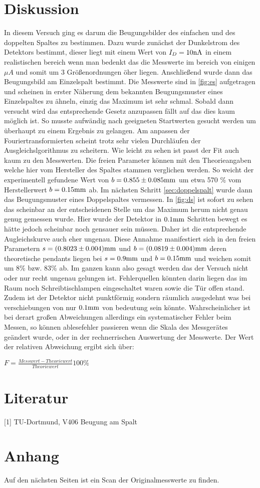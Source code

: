 \section{Diskussion}
\label{sec:diskussion}
In diesem Versuch ging es darum die Beugungsbilder des einfachen und des doppelten Spaltes zu bestimmen.
Dazu wurde zunächst der Dunkelstrom des Detektors bestimmt, dieser liegt mit einem Wert von $I_D=10\si[]{nA}$
in einem realistischen bereich wenn man bedenkt das die Messwerte im bereich von einigen $\mu A$ und somit um
3 Größenordnungen öher liegen. Anschließend wurde dann das Beugungsbild am Einzelspalt bestimmt. Die Messwerte
sind in \autoref{fig:es} aufgetragen und scheinen in erster Näherung dem bekannten Beugungsmuster eines Einzelspaltes
zu ähneln, einzig das Maximum ist sehr schmal. Sobald dann versucht wird das entsprechende Gesetz anzupassen 
fällt auf das dies kaum möglich ist. So musste aufwändig nach geeigneten Startwerten gesucht werden um überhaupt zu
einem Ergebnis zu gelangen. Am anpassen der Fouriertransformierten
scheint trotz sehr vielen Durchläufen der Ausgleichslgorithmus zu scheitern. 
Wie leicht zu sehen ist passt der Fit auch kaum zu den Messwerten. Die freien Parameter
können mit den Theorieangaben welche hier vom Hersteller des Spaltes stammen verglichen werden. So weicht
der experimentell gefundene Wert von $b=0.855\pm 0.085\si[]{mm}$ um etwa 570 \% vom Herstellerwert $b=0.15\si[]{mm}$
ab. Im nächsten Schritt \autoref{sec:doppelspalt} wurde dann das Beugungsmuster eines Doppelspaltes vermessen. 
In \autoref{fig:ds} ist sofort zu sehen das scheinbar an der entscheidenen Stelle um das Maximum herum nicht genau
genug gemessen wurde. Hier wurde der Detektor in $0.1\si[]{mm}$ Schritten bewegt es hätte jedoch scheinbar noch gensauer
sein müssen. Daher ist die entsprechende Augleichskurve auch eher ungenau. Diese Annahme manifestiert sich 
in den freien Parametern $s=(0.8023\pm 0.004)\si[]{mm}$ und $b=(0.0819\pm 0.004)\si[]{mm}$ deren theoretische pendants
liegen bei $s=0.9\si[]{mm}$ und $b=0.15\si[]{mm}$ und weichen somit um 8\% bzw. 83\% ab. Im ganzen kann 
also gesagt werden das der Versuch nicht oder nur recht ungenau gelungen ist. Fehlerquellen könnten darin liegen das
im Raum noch Schreibtischlampen eingeschaltet waren sowie die Tür offen stand. Zudem ist der Detektor nicht 
punktförmig sondern räumlich ausgedehnt was bei verschiebungen von nur $0.1\si[]{mm}$ von bedeutung sein könnte.
Wahrscheinlicher ist bei derart großen Abweichungen allerdings ein systematischer Fehler beim Messen, so können 
ablesefehler passieren wenn die Skala des Messgerätes geändert wurde, oder in der rechnerrischen Auswertung der
Messwerte.
Der Wert der relativen Abweichung ergibt sich über:
\begin{center}
    $F=\frac{Messwert-Theoriewert}{Theoriewert} 100\%$
\end{center}
\section{Literatur}
\label{sec:literatur}
[1] TU-Dortmund, V406 Beugung am Spalt

\section{Anhang}
\label{sec:Anhang}
Auf den nächsten Seiten ist ein Scan der Originalmesswerte zu finden.